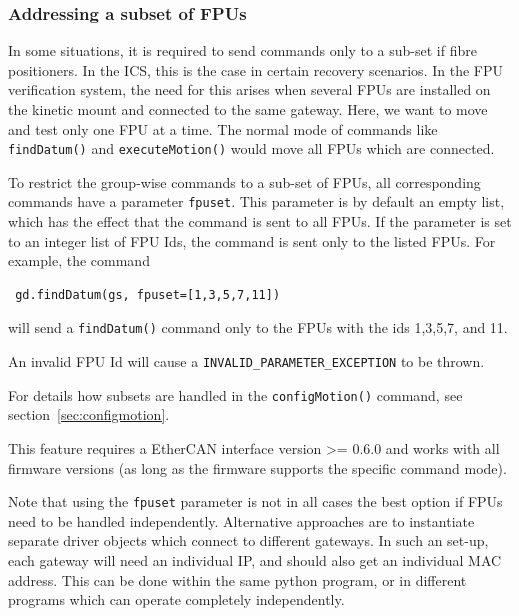 \documentclass[11pt,a4paper]{scrartcl}
\begin{document}
\subsubsection{Addressing a subset of FPUs}
\label{sec:subsets}
 In some situations, it is required
to send commands only to a sub-set if fibre positioners. In the ICS,
this is the case in certain recovery scenarios.  In the FPU
verification system, the need for this arises when several FPUs are
installed on the kinetic mount and connected to the same
gateway. Here, we want to move and test only one FPU at a time. The
normal mode of commands like \texttt{findDatum()} and
\texttt{executeMotion()} would move all FPUs which are connected.

To restrict the group-wise commands to a sub-set of FPUs, all
corresponding commands have a parameter \texttt{fpuset}.  This
parameter is by default an empty list, which has the effect that the
command is sent to all FPUs. If the parameter is set to an integer
list of FPU Ids, the command is sent only to the listed FPUs.
For example, the command

\begin{verbatim}
 gd.findDatum(gs, fpuset=[1,3,5,7,11])
\end{verbatim}
will send a \texttt{findDatum()} command only to the FPUs with the ids
1,3,5,7, and 11.

An invalid FPU Id will cause a \texttt{INVALID\_PARAMETER\_EXCEPTION}
to be thrown.

For details how subsets are handled in the \texttt{configMotion()}
command, see section~\ref{sec:configmotion}.

This feature requires a EtherCAN interface version >= 0.6.0 and works with all
firmware versions (as long as the firmware supports the specific
command mode).

Note that using the \texttt{fpuset} parameter is not in all cases the
best option if FPUs need to be handled independently. Alternative
approaches are to instantiate separate driver objects which connect to
different gateways. In such an set-up, each gateway will need an
individual IP, and should also get an individual MAC address. This can
be done within the same python program, or in different programs which
can operate completely independently.
\end{document}

